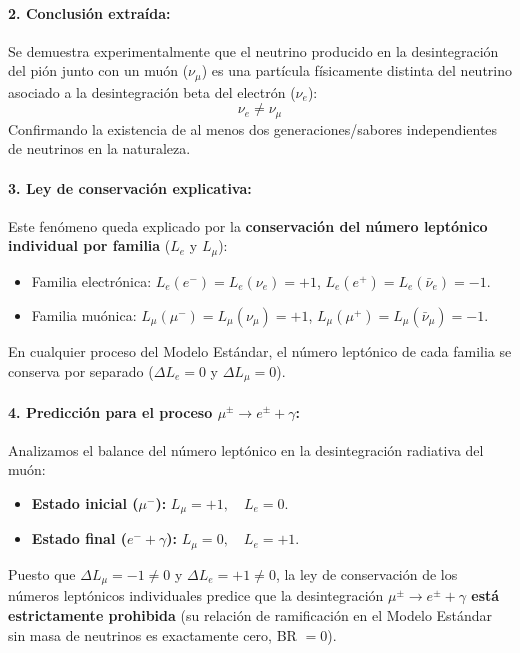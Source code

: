 \begin{problema}
\paragraph{2. Conclusión extraída:}
Se demuestra experimentalmente que el neutrino producido en la desintegración del pión junto con un muón ($\nu_\mu$) es una partícula físicamente distinta del neutrino asociado a la desintegración beta del electrón ($\nu_e$):
\begin{equation*}
\nu_e \neq \nu_\mu
\end{equation*}
Confirmando la existencia de al menos dos generaciones/sabores independientes de neutrinos en la naturaleza.

\paragraph{3. Ley de conservación explicativa:}
Este fenómeno queda explicado por la \textbf{conservación del número leptónico individual por familia} ($L_e$ y $L_\mu$):
\begin{itemize}
    \item Familia electrónica: $L_e(e^-) = L_e(\nu_e) = +1$, $L_e(e^+) = L_e(\bar{\nu}_e) = -1$.
    \item Familia muónica: $L_\mu(\mu^-) = L_\mu(\nu_\mu) = +1$, $L_\mu(\mu^+) = L_\mu(\bar{\nu}_\mu) = -1$.
\end{itemize}
En cualquier proceso del Modelo Estándar, el número leptónico de cada familia se conserva por separado ($\Delta L_e = 0$ y $\Delta L_\mu = 0$).

\paragraph{4. Predicción para el proceso $\mu^\pm \to e^\pm + \gamma$:}
Analizamos el balance del número leptónico en la desintegración radiativa del muón:
\begin{itemize}
    \item \textbf{Estado inicial ($\mu^-$):} $L_\mu = +1, \quad L_e = 0$.
    \item \textbf{Estado final ($e^- + \gamma$):} $L_\mu = 0, \quad L_e = +1$.
\end{itemize}
Puesto que $\Delta L_\mu = -1 \neq 0$ y $\Delta L_e = +1 \neq 0$, la ley de conservación de los números leptónicos individuales predice que la desintegración \textbf{$\mu^\pm \to e^\pm + \gamma$ está estrictamente prohibida} (su relación de ramificación en el Modelo Estándar sin masa de neutrinos es exactamente cero, BR $= 0$).
\end{problema}
